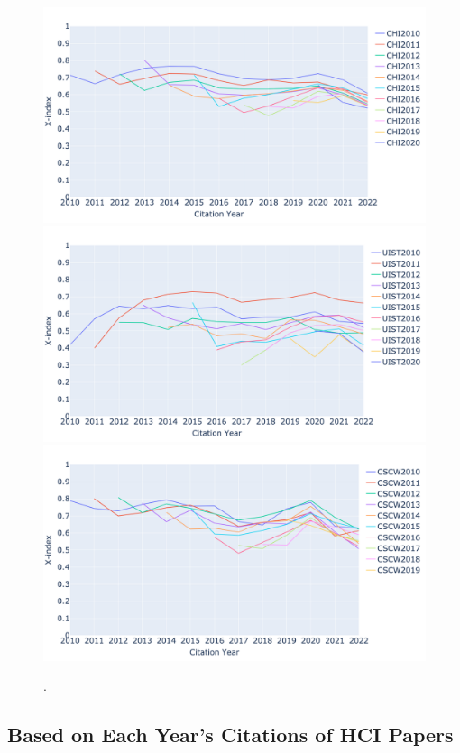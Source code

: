\begin{figure}[t]
    \centering
    \includegraphics[width=\columnwidth]{figures/fig3_CHI.png}
    \includegraphics[width=\columnwidth]{figures/fig3_UIST.png}
    \includegraphics[width=\columnwidth]{figures/fig3_CSCW.png}
    \caption{.}
    \label{fg:fig3}
\end{figure}

\subsection{\xin Based on Each Year's Citations of HCI Papers}

